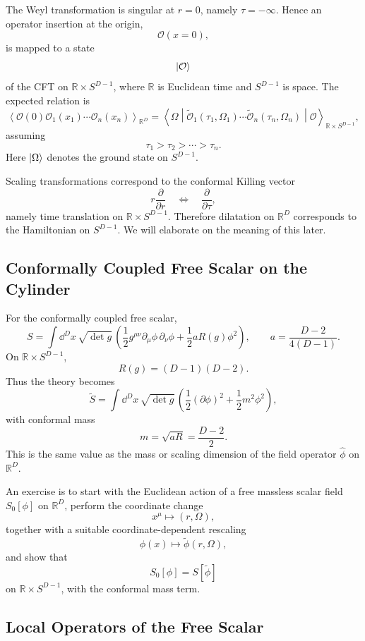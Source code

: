 The Weyl transformation is singular at \(r=0\), namely
\(\tau=-\infty\).  Hence an operator insertion at the origin,
\[
  \mathcal O(x=0),
\]
is mapped to a state
\[
  \ket{\mathcal O}
\]
of the CFT on \(\mathbb R\times S^{D-1}\), where \(\mathbb R\) is
Euclidean time and \(S^{D-1}\) is space.  The expected relation is
\[
  \left\langle
    \mathcal O(0)\mathcal O_1(x_1)\cdots\mathcal O_n(x_n)
  \right\rangle_{\mathbb R^D}
  =
  \left\langle
    \Omega\middle|
    \widetilde{\mathcal O}_1(\tau_1,\Omega_1)\cdots
    \widetilde{\mathcal O}_n(\tau_n,\Omega_n)
    \middle|\mathcal O
  \right\rangle_{\mathbb R\times S^{D-1}},
\]
assuming
\[
  \tau_1>\tau_2>\cdots>\tau_n .
\]
Here \(\ket{\Omega}\) denotes the ground state on \(S^{D-1}\).

Scaling transformations correspond to the conformal Killing vector
\[
  r\frac{\partial}{\partial r}
  \quad\Longleftrightarrow\quad
  \frac{\partial}{\partial\tau},
\]
namely time translation on \(\mathbb R\times S^{D-1}\).  Therefore
dilatation on \(\mathbb R^D\) corresponds to the Hamiltonian on
\(S^{D-1}\).  We will elaborate on the meaning of this later.

\subsection{Conformally Coupled Free Scalar on the Cylinder}

For the conformally coupled free scalar,
\[
  S=
  \int \dd^D x\,\sqrt{\det g}\,
  \left(
    \frac12 g^{\mu\nu}\partial_\mu\phi\,\partial_\nu\phi
    +\frac12 a R(g)\phi^2
  \right),
  \qquad
  a=\frac{D-2}{4(D-1)} .
\]
On \(\mathbb R\times S^{D-1}\),
\[
  R(g)=(D-1)(D-2).
\]
Thus the theory becomes
\[
  \widetilde S=
  \int \dd^D x\,\sqrt{\det g}\,
  \left(
    \frac12(\partial\phi)^2+\frac12 m^2\phi^2
  \right),
\]
with conformal mass
\[
  m=\sqrt{aR}=\frac{D-2}{2}.
\]
This is the same value as the mass or scaling dimension of the field
operator \(\widehat\phi\) on \(\mathbb R^D\).

An exercise is to start with the Euclidean action of a free massless
scalar field \(S_0[\phi]\) on \(\mathbb R^D\), perform the coordinate
change
\[
  x^\mu\mapsto (r,\Omega),
\]
together with a suitable coordinate-dependent rescaling
\[
  \phi(x)\mapsto \widetilde\phi(r,\Omega),
\]
and show that
\[
  S_0[\phi]=S[\widetilde\phi]
\]
on \(\mathbb R\times S^{D-1}\), with the conformal mass term.

\subsection{Local Operators of the Free Scalar}

